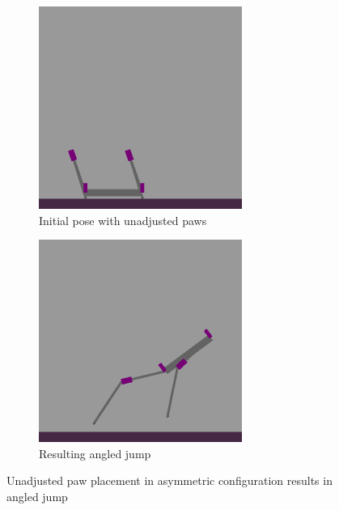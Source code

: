 \begin{figure}[h]
    \centering
    \begin{subfigure}[b]{0.48\textwidth}
        \centering
        \includegraphics[width=\textwidth]{Images/link_length_optimization/unadjusted_paw_pose.png}
        \caption{Initial pose with unadjusted paws}
    \end{subfigure}
    \hfill
    \begin{subfigure}[b]{0.48\textwidth}
        \centering
        \includegraphics[width=\textwidth]{Images/link_length_optimization/unadjusted_paw_jump.png}
        \caption{Resulting angled jump}
    \end{subfigure}
    \caption{Unadjusted paw placement in asymmetric configuration results in angled jump}
    \label{fig:link_length_optimization:unadjusted_jump}
\end{figure}

